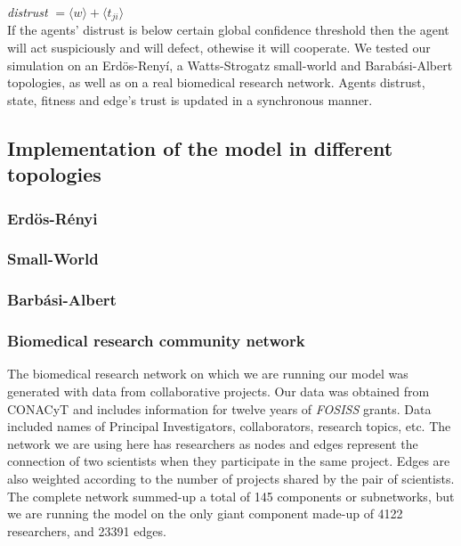 \textit{distrust} $= \langle w \rangle +  \langle t_{ji} \rangle$\\

If the agents' distrust is below certain global confidence threshold then
the agent will act suspiciously and will defect, othewise it will
cooperate. We tested our simulation on an Erd\"{o}s-Reny\'i, a
Watts-Strogatz small-world and Barab\'asi-Albert topologies, as well
as on a real biomedical research network. Agents distrust, state,
fitness and edge's trust is updated in a synchronous manner.   

\subsection{Implementation of the model in different topologies}

\subsubsection{Erd\"{o}s-R\'enyi}

\subsubsection{Small-World}

\subsubsection{Barb\'asi-Albert}

\subsubsection{Biomedical research community network}

The biomedical research network on which we are running our model
was generated with data from collaborative projects. Our data was
obtained from CONACyT and includes information for twelve years of
\textit{FOSISS} grants. Data included names of Principal
Investigators, collaborators, research topics, etc. The network we are
using here has researchers as nodes and edges represent the connection
of two scientists when they participate in the same project. Edges are
also weighted according to the number of projects shared by the pair
of scientists. The complete network summed-up a total of 145
components or subnetworks, but we are running the model on the only
giant component made-up of 4122 researchers, and 23391 edges.\\

